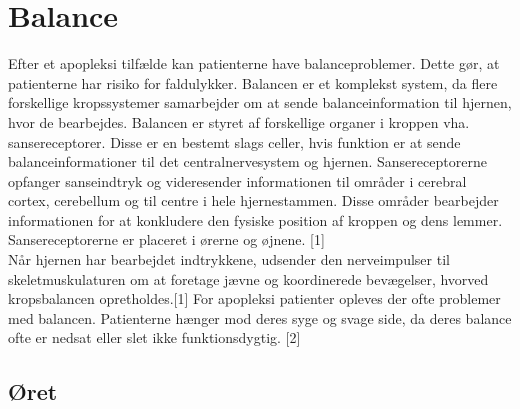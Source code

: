 \section{Balance}
Efter et apopleksi tilfælde kan patienterne have balanceproblemer. Dette gør, at patienterne har risiko for faldulykker. Balancen er et komplekst system, da flere forskellige kropssystemer samarbejder om at sende balanceinformation til hjernen, hvor de bearbejdes. Balancen er styret af forskellige organer i kroppen vha. sansereceptorer. Disse er en bestemt slags celler, hvis funktion er at sende balanceinformationer til det centralnervesystem og hjernen. Sansereceptorerne opfanger sanseindtryk og videresender informationen til områder i cerebral cortex, cerebellum og til centre i hele hjernestammen. Disse områder bearbejder informationen for at konkludere den fysiske position af kroppen og dens lemmer. Sansereceptorerne er placeret i ørerne og øjnene. [1]\\
Når hjernen har bearbejdet indtrykkene, udsender den nerveimpulser til skeletmuskulaturen om at foretage jævne og koordinerede bevægelser, hvorved kropsbalancen opretholdes.[1] For apopleksi patienter opleves der ofte problemer med balancen. Patienterne hænger mod deres syge og svage side, da deres balance ofte er nedsat eller slet ikke funktionsdygtig. [2]

\subsection{Øret} 

